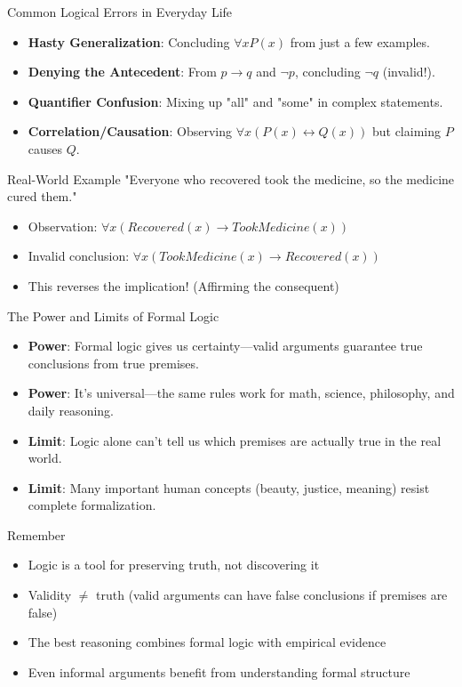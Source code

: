 \documentclass{beamer}
\begin{document}
	\begin{frame}{Common Logical Errors in Everyday Life}
		\begin{itemize}
			\item \textbf{Hasty Generalization}: Concluding $\forall x P(x)$ from just a few examples.
			\item \textbf{Denying the Antecedent}: From $p \rightarrow q$ and $\neg p$, concluding $\neg q$ (invalid!).
			\item \textbf{Quantifier Confusion}: Mixing up "all" and "some" in complex statements.
			\item \textbf{Correlation/Causation}: Observing $\forall x (P(x) \leftrightarrow Q(x))$ but claiming $P$ causes $Q$.
		\end{itemize}
		
		\begin{alertblock}{Real-World Example}
			"Everyone who recovered took the medicine, so the medicine cured them."
			\begin{itemize}
				\item Observation: $\forall x (Recovered(x) \rightarrow TookMedicine(x))$
				\item Invalid conclusion: $\forall x (TookMedicine(x) \rightarrow Recovered(x))$
				\item This reverses the implication! (Affirming the consequent)
			\end{itemize}
		\end{alertblock}
	\end{frame}
	
	\begin{frame}{The Power and Limits of Formal Logic}
		\begin{itemize}
			\item \textbf{Power}: Formal logic gives us certainty—valid arguments guarantee true conclusions from true premises.
			\item \textbf{Power}: It's universal—the same rules work for math, science, philosophy, and daily reasoning.
			\item \textbf{Limit}: Logic alone can't tell us which premises are actually true in the real world.
			\item \textbf{Limit}: Many important human concepts (beauty, justice, meaning) resist complete formalization.
		\end{itemize}
		
		\begin{block}{Remember}
			\begin{itemize}
				\item Logic is a tool for preserving truth, not discovering it
				\item Validity $\neq$ truth (valid arguments can have false conclusions if premises are false)
				\item The best reasoning combines formal logic with empirical evidence
				\item Even informal arguments benefit from understanding formal structure
			\end{itemize}
		\end{block}
	\end{frame}
	
\end{document}
